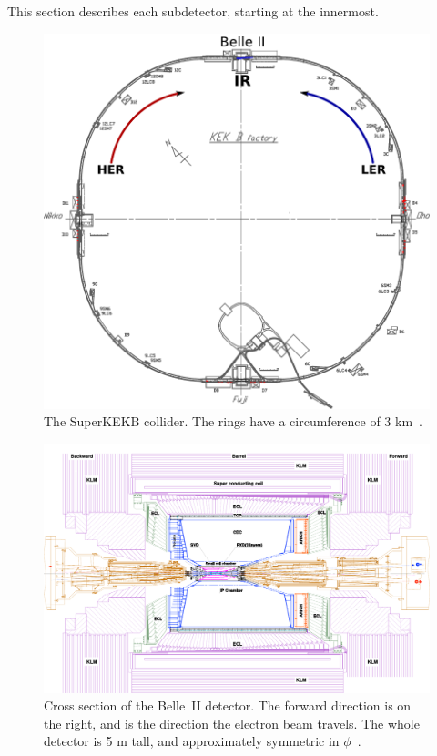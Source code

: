  This section describes each subdetector, starting at the innermost.

\begin{figure}[htb]
	\centerfloat
		\includegraphics[scale=0.6]{images/SKEKb_key}
	\caption[The SuperKEKB \epem collider]{The SuperKEKB \epem collider. The rings have a circumference of 3 km~\cite{SKBgroup}.}
	\label{fig:SKB}
\end{figure}




\begin{figure}
	\centering
	\includegraphics[width=\paperwidth]{images/Belle-llTopview_simple}
	\caption[The Belle~II detector]{Cross section of the Belle~II detector. The forward direction is on the right, and is the direction the electron beam travels. The whole detector is 5 m tall, and approximately symmetric in $\phi$~\cite{BELLE2TDR}.}
	\label{fig:BELLE2}
\end{figure}


